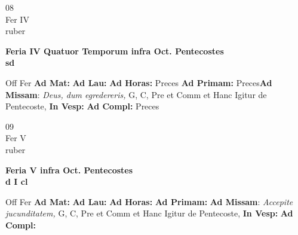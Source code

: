 \documentclass[10pt, openany]{book}
\begin{document}
        \begin{center}
            \begin{minipage}{3.5in}
                \vspace{2em}
                \begin{minipage}{0.5in}
                    {\Huge 08} \\
                    {\normalsize Fer IV} \\
                    {\normalsize ruber}
                \end{minipage}
                \begin{minipage}{3.0in}
                    \textbf{ \large Feria IV Quatuor Temporum infra Oct. Pentecostes \\
                    \textnormal{\normalsize sd}} \\ 
                \end{minipage}
                \begin{justify}Off Fer
                    \textbf{Ad Mat: }
                    \textbf{Ad Lau: }
                    \textbf{Ad Horas: }Preces
                    \textbf{Ad Primam: }Preces\textbf{Ad Missam}: \textit{Deus, dum egredereris,} G, C, Pre et Comm et Hanc Igitur de Pentecoste,  
                    \textbf{In Vesp: }
                    \textbf{Ad Compl: }Preces
                \end{justify}
            \end{minipage}
        \end{center}
    
        \begin{center}
            \begin{minipage}{3.5in}
                \vspace{2em}
                \begin{minipage}{0.5in}
                    {\Huge 09} \\
                    {\normalsize Fer V} \\
                    {\normalsize ruber}
                \end{minipage}
                \begin{minipage}{3.0in}
                    \textbf{ \large Feria V infra Oct. Pentecostes \\
                    \textnormal{\normalsize d I cl}} \\ 
                \end{minipage}
                \begin{justify}Off Fer
                    \textbf{Ad Mat: }
                    \textbf{Ad Lau: }
                    \textbf{Ad Horas: }
                    \textbf{Ad Primam: }\textbf{Ad Missam}: \textit{Accepite jucunditatem,} G, C, Pre et Comm et Hanc Igitur de Pentecoste,  
                    \textbf{In Vesp: }
                    \textbf{Ad Compl: }
                \end{justify}
            \end{minipage}
        \end{center}
    
\end{document}
